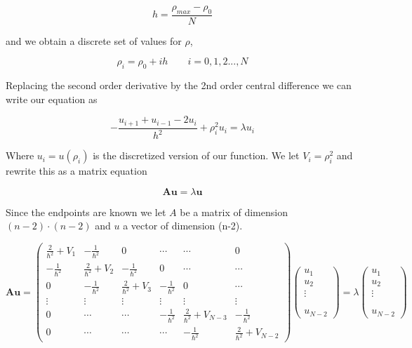 \documentclass[%
 reprint,
 nobalancelastpage,
 amsmath,amssymb,
 aps,
]{revtex4-1}
\begin{document}
\begin{equation}
	h = \frac{\rho_{max}-\rho_{0}}{N}
\end{equation}

and we obtain a discrete set of values for $\rho$, 

\begin{equation}
	\rho_{i} = \rho_{0} + ih \qquad i=0,1,2...,N
\end{equation}

Replacing the second order derivative by the 2nd order central difference we can write our equation as 

\begin{equation}
	-\frac{u_{i+1}+u_{i-1}-2u_{i}}{h^{2}} + \rho_{i}^{2}u_{i} = \lambda u_{i}
\end{equation}

Where $u_{i} = u(\rho_{i})$ is the discretized version of our function. We let $V_{i} = \rho_{i}^{2}$ and rewrite this as a matrix equation

\begin{equation}
	\bm{Au} = \lambda\bm{u}
\end{equation}

Since the endpoints are known we let $A$ be a matrix of dimension $(n-2)\cdot(n-2)$ and $u$ a vector of dimension (n-2).


\begin{widetext}
\begin{equation}
\bm{Au} =
\begin{pmatrix}
  \frac{2}{\hbar^{2}} + V_{1} & -\frac{1}{\hbar^{2}} & 0 & \cdots & \cdots & 0 \\
  -\frac{1}{\hbar^{2}} & \frac{2}{\hbar^{2}} + V_{2} &  -\frac{1}{\hbar^{2}} & 0 &\cdots & \cdots \\
  0 & -\frac{1}{\hbar^{2}} & \frac{2}{\hbar^{2}} + V_{3} & -\frac{1}{\hbar^{2}} & 0 & \cdots \\
  \vdots & \vdots & \vdots & \vdots & \vdots & \vdots \\
  0 & \cdots & \cdots & -\frac{1}{\hbar^{2}} & \frac{2}{\hbar^{2}} + V_{N-3} & -\frac{1}{\hbar^{2}} \\
  0 & \cdots & \cdots & \cdots & -\frac{1}{\hbar^{2}} & \frac{2}{\hbar^{2}} + V_{N-2}
\end{pmatrix}
\begin{pmatrix}
	u_{1} \\
	u_{2} \\
	\vdots \\
	\\
	\\
	u_{N-2}
\end{pmatrix}
=	\lambda
\begin{pmatrix}
	u_{1} \\
	u_{2} \\
	\vdots \\
	\\
	\\
	u_{N-2}
\end{pmatrix}
\end{equation}
\end{widetext}
\end{document}

